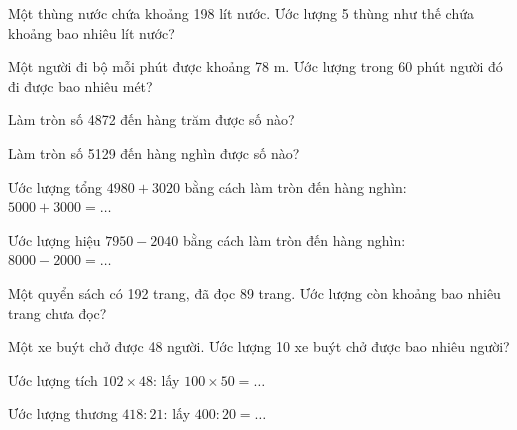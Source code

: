 \begin{ex}
Một thùng nước chứa khoảng 198 lít nước. Ước lượng 5 thùng như thế chứa khoảng bao nhiêu lít nước?
\end{ex}

\begin{ex}
Một người đi bộ mỗi phút được khoảng 78 m. Ước lượng trong 60 phút người đó đi được bao nhiêu mét?
\end{ex}

\begin{ex}
Làm tròn số 4872 đến hàng trăm được số nào?
\end{ex}

\begin{ex}
Làm tròn số 5129 đến hàng nghìn được số nào?
\end{ex}

\begin{ex}
Ước lượng tổng $4980 + 3020$ bằng cách làm tròn đến hàng nghìn: $5000 + 3000 = \dots$
\end{ex}

\begin{ex}
Ước lượng hiệu $7950 - 2040$ bằng cách làm tròn đến hàng nghìn: $8000 - 2000 = \dots$
\end{ex}

\begin{ex}
Một quyển sách có 192 trang, đã đọc 89 trang. Ước lượng còn khoảng bao nhiêu trang chưa đọc?
\end{ex}

\begin{ex}
Một xe buýt chở được 48 người. Ước lượng 10 xe buýt chở được bao nhiêu người?
\end{ex}

\begin{ex}
Ước lượng tích $102 \times 48$: lấy $100 \times 50 = \dots$
\end{ex}

\begin{ex}
Ước lượng thương $418 : 21$: lấy $400 : 20 = \dots$
\end{ex}

